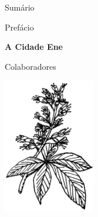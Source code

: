 \thispagestyle{empty}
\MyriadPro
Sumário

\hspace{2cm}{\footnotesize\Georgia{\pageref{prefacio}}} \hspace{.6cm} {\footnotesize{Prefácio}} 

\medskip

\hspace{2cm}{\footnotesize\Georgia{\pageref{cidade}}} \hspace{.4cm} {\footnotesize\textbf{A Cidade Ene}} 

\medskip

\hspace{2cm}{\footnotesize\Georgia{\pageref{colaboradores}}} \hspace{.28cm} {\footnotesize{Colaboradores}}

\begin{flushright}
\vfill
\includegraphics[width=4cm]{./castanha.jpg}
\end{flushright}

\pagebreak
\thispagestyle{empty}